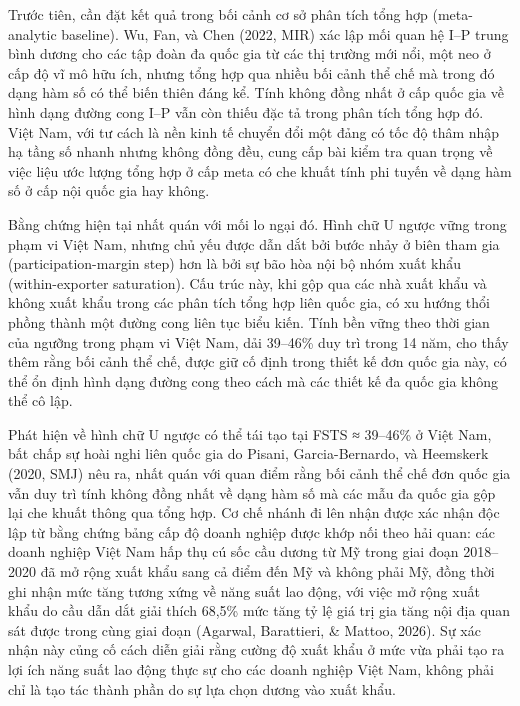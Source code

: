 \documentclass[12pt,a4paper]{article}
\begin{document}
Trước tiên, cần đặt kết quả trong bối cảnh cơ sở phân tích tổng hợp
(meta-analytic baseline). Wu, Fan, và Chen (2022, MIR) xác lập mối quan
hệ I--P trung bình dương cho các tập đoàn đa quốc gia từ các thị trường
mới nổi, một neo ở cấp độ vĩ mô hữu ích, nhưng tổng hợp qua nhiều bối
cảnh thể chế mà trong đó dạng hàm số có thể biến thiên đáng kể. Tính
không đồng nhất ở cấp quốc gia về hình dạng đường cong I--P vẫn còn
thiếu đặc tả trong phân tích tổng hợp đó. Việt Nam, với tư cách là nền
kinh tế chuyển đổi một đảng có tốc độ thâm nhập hạ tầng số nhanh nhưng
không đồng đều, cung cấp bài kiểm tra quan trọng về việc liệu ước lượng
tổng hợp ở cấp meta có che khuất tính phi tuyến về dạng hàm số ở cấp nội
quốc gia hay không.

Bằng chứng hiện tại nhất quán với mối lo ngại đó. Hình chữ U ngược vững
trong phạm vi Việt Nam, nhưng chủ yếu được dẫn dắt bởi bước nhảy ở biên
tham gia (participation-margin step) hơn là bởi sự bão hòa nội bộ nhóm
xuất khẩu (within-exporter saturation). Cấu trúc này, khi gộp qua các
nhà xuất khẩu và không xuất khẩu trong các phân tích tổng hợp liên quốc
gia, có xu hướng thổi phồng thành một đường cong liên tục biểu kiến.
Tính bền vững theo thời gian của ngưỡng trong phạm vi Việt Nam, dải
39--46\% duy trì trong 14 năm, cho thấy thêm rằng bối cảnh thể chế, được
giữ cố định trong thiết kế đơn quốc gia này, có thể ổn định hình dạng
đường cong theo cách mà các thiết kế đa quốc gia không thể cô lập.

Phát hiện về hình chữ U ngược có thể tái tạo tại FSTS ≈ 39--46\% ở Việt
Nam, bất chấp sự hoài nghi liên quốc gia do Pisani, Garcia-Bernardo, và
Heemskerk (2020, SMJ) nêu ra, nhất quán với quan điểm rằng bối cảnh thể
chế đơn quốc gia vẫn duy trì tính không đồng nhất về dạng hàm số mà các
mẫu đa quốc gia gộp lại che khuất thông qua tổng hợp. Cơ chế nhánh đi
lên nhận được xác nhận độc lập từ bằng chứng bảng cấp độ doanh nghiệp
được khớp nối theo hải quan: các doanh nghiệp Việt Nam hấp thụ cú sốc
cầu dương từ Mỹ trong giai đoạn 2018--2020 đã mở rộng xuất khẩu sang cả
điểm đến Mỹ và không phải Mỹ, đồng thời ghi nhận mức tăng tương xứng về
năng suất lao động, với việc mở rộng xuất khẩu do cầu dẫn dắt giải thích
68,5\% mức tăng tỷ lệ giá trị gia tăng nội địa quan sát được trong cùng
giai đoạn (Agarwal, Barattieri, \& Mattoo, 2026). Sự xác nhận này củng
cố cách diễn giải rằng cường độ xuất khẩu ở mức vừa phải tạo ra lợi ích
năng suất lao động thực sự cho các doanh nghiệp Việt Nam, không phải chỉ
là tạo tác thành phần do sự lựa chọn dương vào xuất khẩu.
\end{document}
